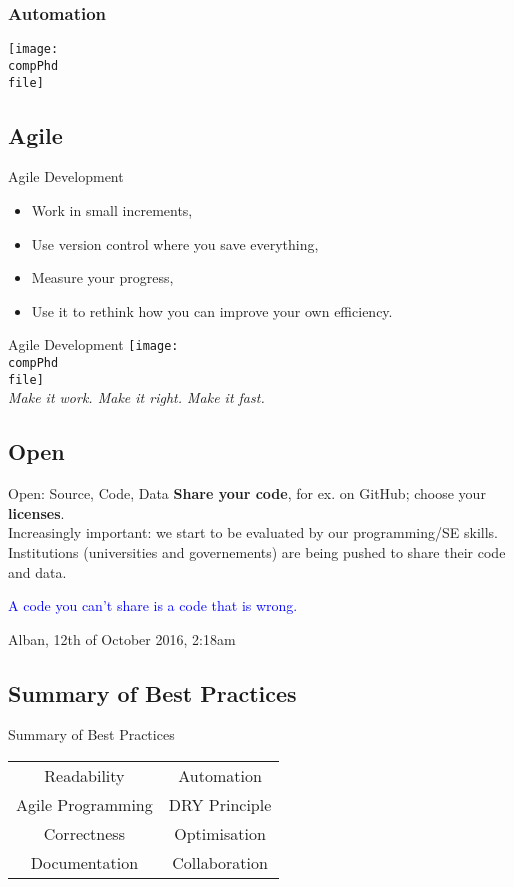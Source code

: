 \documentclass[]{beamer} %
\def\pathbase{/Users/pmxal9/} 	%
\def\pathbase{/Users/pmaal/} 	%
\edef\drop{\pathbase Dropbox/}		%
\edef\compPhd{\drop Nottingham/repos/phd/Seminars/+MatlabComputationalPhD/}
\begin{document}
\begin{frame}\frametitle{Automation}\centering
\def\file{xkcd/automation}
\texttt{[image: \\compPhd \\file]}
\end{frame}


\subsection{Agile}
\begin{frame}{Agile Development}\centering
\begin{itemize}
\item Work in small increments,
\item Use version control where you save everything,
\item Measure your progress, 
\item Use it to rethink how you can improve your own efficiency.
\end{itemize}
\end{frame}


\begin{frame}{Agile Development}\centering
\def\file{xkcd/the_general_problem}
\texttt{[image: \\compPhd \\file]}\\[3mm]
\pause
\textit{Make it work. Make it right. Make it fast.}
\end{frame}


\subsection{Open}
\begin{frame}{Open: Source, Code, Data}
\textbf{Share your code}, for ex. on GitHub; choose your \textbf{licenses}.\\[3mm]
Increasingly important: we start to be evaluated by our programming/SE skills.\\[3mm]
Institutions (universities and governements) are being pushed to share their code and data.\\[3mm]
\pause
\begin{center}\textcolor{blue}{A code you can't share is a code that is wrong.}\end{center}
\pause \hfill Alban, 12th of October 2016, 2:18am
\end{frame}


\subsection{Summary of Best Practices}
\begin{frame}{Summary of Best Practices}\centering
\begin{tabular}{c c}
Readability & Automation\\
Agile Programming & DRY Principle\\
Correctness & Optimisation \\
Documentation & Collaboration
\end{tabular}
\end{frame} 
\end{document}
